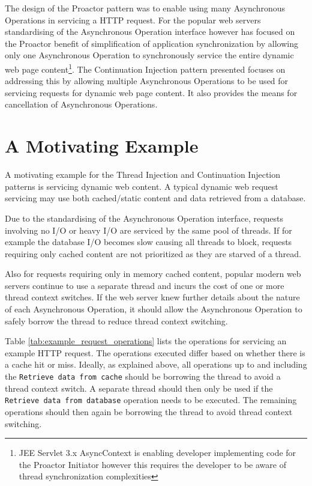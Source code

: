 \documentclass[prodmode]{style/acmlarge}
\begin{document}
The design of the Proactor pattern was to enable using many Asynchronous
Operations in servicing a HTTP request.  For the popular web servers
standardising of the Asynchronous Operation interface however has focused on the
Proactor benefit of simplification of application synchronization by allowing
only one Asynchronous Operation to synchronously service the entire dynamic web
page content\footnote{JEE Servlet 3.x AsyncContext is enabling developer
implementing code for the Proactor Initiator however this requires the developer
to be aware of thread synchronization complexities}.  The Continuation Injection
pattern presented focuses on addressing this by allowing multiple Asynchronous
Operations to be used for servicing requests for dynamic web page content. It
also provides the means for cancellation of Asynchronous Operations.


\section{A Motivating Example}

A motivating example for the Thread Injection and Continuation Injection
patterns is servicing dynamic web content.  A typical dynamic web request
servicing may use both cached/static content and data retrieved from a database.

Due to the standardising of the Asynchronous Operation interface, requests
involving no I/O or heavy I/O are serviced by the same pool of threads.
If for example the database I/O becomes slow causing all threads to block,
requests requiring only cached content are not prioritized as they are starved
of a thread.

Also for requests requiring only in memory cached content, popular modern web
servers continue to use a separate thread and incurs the cost of one or more
thread context switches.  If the web server knew further details about the
nature of each Asynchronous Operation, it should allow the Asynchronous
Operation to safely borrow the thread to reduce thread context switching.

Table \ref{tab:example_request_operations} lists the operations for servicing an
example HTTP request.  The operations executed differ based on whether there is
a cache hit or miss.  Ideally, as explained above, all operations up to and
including the \texttt{Retrieve data from cache} should be borrowing the thread
to avoid a thread context switch.  A separate thread should then only be used if
the \texttt{Retrieve data from database} operation needs to be executed.  The
remaining operations should then again be borrowing the thread to avoid thread
context switching.
\end{document}
